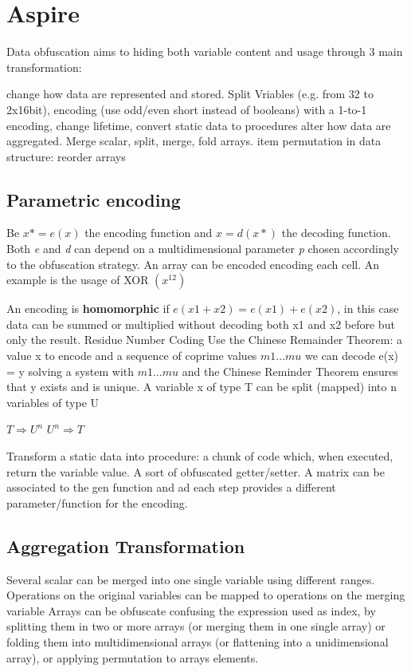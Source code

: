 \chapter{Aspire}
	Data obfuscation aims to hiding both variable content and usage through 3 main transformation:
	\begin{itemize}
	 change how data are represented and stored. Split Vriables (e.g. from 32 to 2x16bit), encoding (use odd/even short instead of booleans) with a 1-to-1 encoding, change lifetime, convert static data to procedures
		 alter how data are aggregated. Merge scalar, split, merge, fold arrays.
		 item permutation in data structure: reorder arrays
	\end{itemize}
	
\section{Parametric encoding}
	Be $x* = e(x)$ the encoding function and $x = d(x*)$ the decoding function. Both \textit{e} and \textit{d} can depend on a multidimensional parameter \textit{p} chosen accordingly to the obfuscation strategy.	An array can be encoded encoding each cell.	An example is the usage of XOR $(x^{12})$
	
	An encoding is \textbf{homomorphic} if $e(x1 + x2) = e(x1) + e(x2)$, in this case data can be summed or multiplied without decoding both x1 and x2 before but only the result.
	Residue Number Coding
	Use the Chinese Remainder Theorem: a value x to encode and a sequence of coprime values $m1 ... mu$ we can decode e(x) = y solving a system with $m1 ... mu$ and the Chinese Reminder Theorem ensures that y exists and is unique.
	A variable x of type T can be split (mapped) into n variables of type U
	\begin{itemize}
		 $ {T} \Rightarrow {U^{n}} $
		 $ {U^{n}} \Rightarrow {T} $
	\end{itemize}
	Transform a static data into procedure: a chunk of code which, when executed, return the variable value. A sort of obfuscated getter/setter. A matrix can be associated to the gen function and ad each step provides a different parameter/function for the encoding.

\section{Aggregation Transformation}
	Several scalar can be merged into one single variable using different ranges. Operations on the original variables can be mapped to operations on the merging variable
	Arrays can be obfuscate confusing the expression used as index, by splitting them in two or more arrays (or merging them in one single array) or folding them into multidimensional arrays (or flattening into a unidimensional array), or applying permutation to arrays elements.
	
